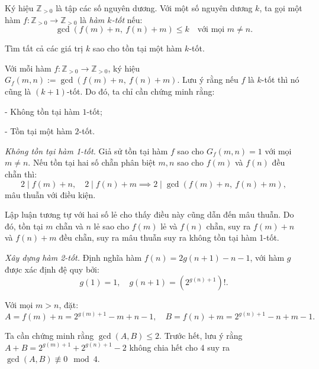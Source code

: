 \ifshowproblemandsoln
\ifshowproblem\begin{problem}\label{problem:IMO-2015-SL-P7}\fi
\ifshowsoln\begin{problem}\fi
    Ký hiệu \( \mathbb{Z}_{>0} \) là tập các số nguyên dương.
    Với một số nguyên dương \( k \), ta gọi một hàm \( f: \mathbb{Z}_{>0} \to \mathbb{Z}_{>0} \) là \textit{hàm \( k \)-tốt} nếu:
    \[
        \gcd(f(m) + n,\ f(n) + m) \le k \quad \text{với mọi } m \ne n.
    \]
    
    Tìm tất cả các giá trị \( k \) sao cho tồn tại một hàm \( k \)-tốt.    
\end{problem}
\fi

\ifshowsoln
\begin{soln}\footnotemark
    Với mỗi hàm \( f : \mathbb{Z}_{>0} \to \mathbb{Z}_{>0} \), ký hiệu \( G_f(m,n) := \gcd(f(m) + n,\ f(n) + m) \).
    Lưu ý rằng nếu \( f \) là \( k \)-tốt thì nó cũng là \( (k+1) \)-tốt. Do đó, ta chỉ cần chứng minh rằng:
    
    - Không tồn tại hàm \( 1 \)-tốt;
    
    - Tồn tại một hàm \( 2 \)-tốt.

    \textit{Không tồn tại hàm 1-tốt.} Giả sử tồn tại hàm \( f \) sao cho \( G_f(m,n) = 1 \) với mọi \( m \ne n \).
    Nếu tồn tại hai số chẵn phân biệt \( m, n \) sao cho \( f(m) \) và \( f(n) \) đều chẵn thì:
    \[
        2 \mid f(m) + n,\quad 2 \mid f(n) + m \implies 2 \mid \gcd(f(m) + n,\ f(n) + m),
    \]
    mâu thuẫn với điều kiện.
    
    Lập luận tương tự với hai số lẻ cho thấy điều này cũng dẫn đến mâu thuẫn.
    Do đó, tồn tại \( m \) chẵn và \( n \) lẻ sao cho \( f(m) \) lẻ và \( f(n) \) chẵn,
    suy ra \( f(m) + n \) và \( f(n) + m \) đều chẵn, suy ra mâu thuẫn suy ra không tồn tại hàm 1-tốt.

    \textit{Xây dựng hàm 2-tốt.} Định nghĩa hàm \( f(n) = 2g(n+1) - n - 1 \), với hàm \( g \) được xác định đệ quy bởi:
    \[
        g(1) = 1,\quad g(n+1) = \left(2^{g(n) + 1}\right)!.
    \]

    Với mọi \( m > n \), đặt:
    \[
        A = f(m) + n = 2^{g(m)+1} - m + n - 1,\quad B = f(n) + m = 2^{g(n)+1} - n + m - 1.
    \]

    Ta cần chứng minh rằng \( \gcd(A,B) \le 2 \). Trước hết, lưu ý rằng \( A + B = 2^{g(m)+1} + 2^{g(n)+1} - 2 \) không chia hết cho 4
    suy ra \( \gcd(A,B) \not\equiv 0 \mod 4 \).


\end{soln}
\end{problem}
